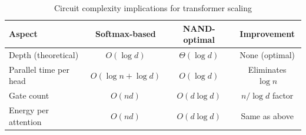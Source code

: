 \documentclass[11pt]{article}
\theoremstyle{definition}
\begin{document}
\begin{table}[ht]






\centering






\caption{Circuit complexity implications for transformer scaling}






\begin{tabular}{lccc}






\hline






\textbf{Aspect} & \textbf{Softmax-based} & \textbf{NAND-optimal} & \textbf{Improvement} \\






\hline






Depth (theoretical) & $O(\log d)$ & $\Theta(\log d)$ & None (optimal) \\






Parallel time per head & $O(\log n + \log d)$ & $O(\log d)$ & Eliminates $\log n$ \\






Gate count & $O(nd)$ & $O(d \log d)$ & $n/\log d$ factor \\






Energy per attention & $O(nd)$ & $O(d \log d)$ & Same as above \\






\hline






\end{tabular}






\label{tab:complexity-comparison}






\end{table}
\end{document}
